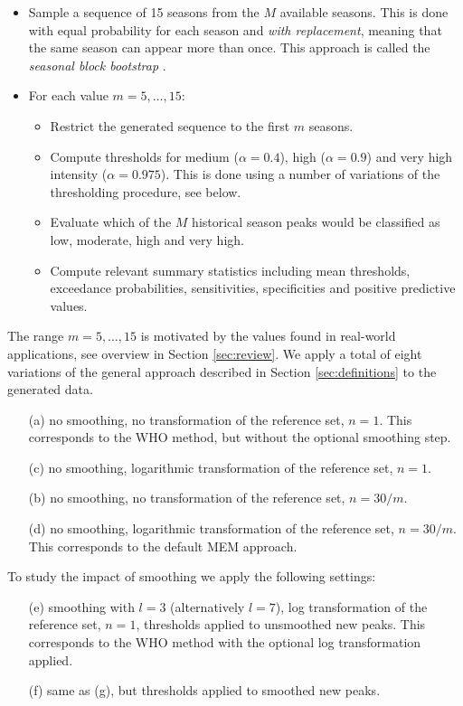 \documentclass{article}
\begin{document}
\begin{itemize}
\item Sample a sequence of 15 seasons from the $M$ available seasons. This is done with equal probability for each season and \textit{with replacement}, meaning that the same season can appear more than once. This approach is called the \textit{seasonal block bootstrap} \citep{Politis2001}.
\item For each value $m = 5, \dots, 15$:
\begin{itemize}
\item Restrict the generated sequence to the first $m$ seasons.
\item Compute thresholds for medium ($\alpha = 0.4$), high ($\alpha = 0.9$) and very high intensity ($\alpha = 0.975$). This is done using a number of variations of the thresholding procedure, see below.
\item Evaluate which of the $M$ historical season peaks would be classified as low, moderate, high and very high.
\item Compute relevant summary statistics including mean thresholds, exceedance probabilities, sensitivities, specificities and positive predictive values.
\end{itemize}
\end{itemize}
The range $m =5, \dots, 15$ is motivated by the values found in real-world applications, see overview in Section \ref{sec:review}. We apply a total of eight variations of the general approach described in Section \ref{sec:definitions} to the generated data.
\begin{enumerate}
\item[(a)] no smoothing, no transformation of the reference set, $n = 1$. This corresponds to the WHO method, but without the optional smoothing step.
\item[(c)] no smoothing, logarithmic transformation of the reference set, $n = 1$.
\item[(b)] no smoothing, no transformation of the reference set, $n = 30/m$.
\item[(d)] no smoothing, logarithmic transformation of the reference set, $n = 30/m$. This corresponds to the default MEM approach.
\end{enumerate}
\noindent To study the impact of smoothing we apply the following settings:
\begin{enumerate}
\item[(e)] smoothing with $l = 3$ (alternatively $l = 7$), log transformation of the reference set, $n = 1$, thresholds applied to unsmoothed new peaks. This corresponds to the WHO method with the optional log transformation applied.
\item[(f)] same as (g), but thresholds applied to smoothed new peaks.
\end{enumerate}
\end{document}
